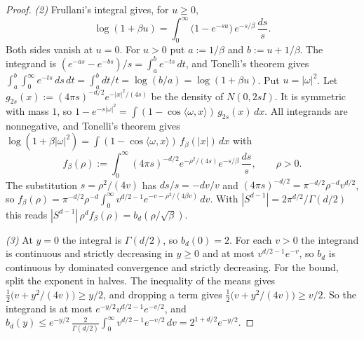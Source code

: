 \begin{proof}
\emph{(2)} Frullani's integral gives, for $u \ge 0$,
\[
  \log(1 + \beta u) = \int_0^\infty\bigl(1 - e^{-su}\bigr)\,e^{-s/\beta}\,\frac{ds}{s} .
\]
Both sides vanish at $u = 0$. For $u > 0$ put $a := 1/\beta$ and $b := u + 1/\beta$. The integrand is
$(e^{-as} - e^{-bs})/s = \int_a^be^{-ts}\,dt$, and Tonelli's theorem gives
$\int_a^b\int_0^\infty e^{-ts}\,ds\,dt = \int_a^bdt/t = \log(b/a) = \log(1 + \beta u)$.
Put $u = |\omega|^2$. Let $g_{2s}(x) := (4\pi s)^{-d/2}e^{-|x|^2/(4s)}$ be the density of
$N(0, 2sI)$. It is symmetric with mass $1$, so
$1 - e^{-s|\omega|^2} = \int(1 - \cos\langle\omega, x\rangle)\,g_{2s}(x)\,dx$. All integrands are
nonnegative, and Tonelli's theorem gives
$\log(1 + \beta|\omega|^2) = \int(1 - \cos\langle\omega, x\rangle)\,f_\beta(|x|)\,dx$ with
\[
  f_\beta(\rho) := \int_0^\infty(4\pi s)^{-d/2}e^{-\rho^2/(4s)}e^{-s/\beta}\,\frac{ds}{s} ,
  \qquad \rho > 0 .
\]
The substitution $s = \rho^2/(4v)$ has $ds/s = -dv/v$ and $(4\pi s)^{-d/2} = \pi^{-d/2}\rho^{-d}v^{d/2}$,
so $f_\beta(\rho) = \pi^{-d/2}\rho^{-d}\int_0^\infty v^{d/2-1}e^{-v-\rho^2/(4\beta v)}\,dv$. With
$|S^{d-1}| = 2\pi^{d/2}/\Gamma(d/2)$ this reads $|S^{d-1}|\,\rho^df_\beta(\rho) = b_d(\rho/\sqrt\beta)$.

\emph{(3)} At $y = 0$ the integral is $\Gamma(d/2)$, so $b_d(0) = 2$. For each $v > 0$ the integrand
is continuous and strictly decreasing in $y \ge 0$ and at most $v^{d/2-1}e^{-v}$, so $b_d$ is
continuous by dominated convergence and strictly decreasing. For the bound, split the exponent in
halves. The inequality of the means gives $\tfrac12\bigl(v + y^2/(4v)\bigr) \ge y/2$, and dropping
a term gives $\tfrac12\bigl(v + y^2/(4v)\bigr) \ge v/2$. So the integrand is at most
$e^{-y/2}v^{d/2-1}e^{-v/2}$, and
$b_d(y) \le e^{-y/2}\,\frac{2}{\Gamma(d/2)}\int_0^\infty v^{d/2-1}e^{-v/2}\,dv = 2^{1+d/2}e^{-y/2}$.


\end{proof}
